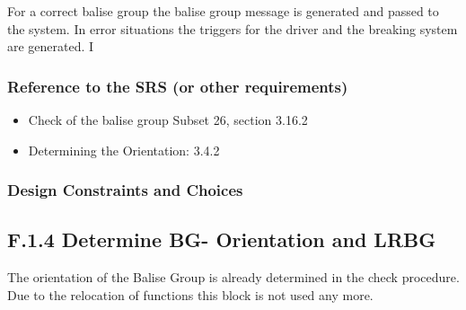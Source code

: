 \documentclass{template/openetcs_report}
\begin{document}
For a correct balise group the balise group message is generated and passed to the system.
In error situations the triggers for the driver and the breaking system are generated.
I
\subsubsection{Reference to the SRS (or other requirements)}
\begin{itemize}
\item Check of the balise group Subset 26, section 3.16.2\\
\item Determining the Orientation: 3.4.2\\
\end{itemize}

\subsubsection{Design Constraints and Choices}



\subsection{F.1.4 Determine BG- Orientation and LRBG}

The orientation of the Balise Group is already determined in the check procedure. Due to the relocation of functions this block is not used any more.
\end{document}
